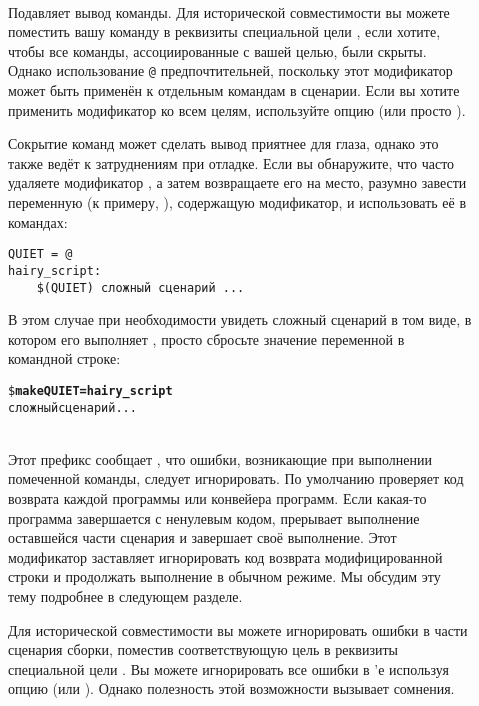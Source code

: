 \begin{description}
\item[] \hfill \\
Подавляет вывод команды. Для исторической совместимости вы можете
поместить вашу команду в реквизиты специальной цели ,
если хотите, чтобы все команды, ассоциированные с вашей целью, были
скрыты. Однако использование \texttt{@} предпочтительней, поскольку
этот модификатор может быть применён к отдельным командам в сценарии.
Если вы хотите применить модификатор ко всем целям, используйте
опцию  (или просто ).

Сокрытие команд может сделать вывод \GNUmake{} приятнее для глаза,
однако это также ведёт к затруднениям при отладке. Если вы обнаружите,
что часто удаляете модификатор , а затем возвращаете его на
место, разумно завести переменную (к примеру, ),
содержащую модификатор, и использовать её в командах:

{\footnotesize
\begin{verbatim}
QUIET = @
hairy_script:
    $(QUIET) сложный сценарий ...
\end{verbatim}
}

В этом случае при необходимости увидеть сложный сценарий в том виде, в
котором его выполняет \GNUmake{}, просто сбросьте значение переменной
 в командной строке:

{\footnotesize
\begin{alltt}
\${} \textbf{make QUIET= hairy\_script}
сложный сценарий ...
\end{alltt}
}

\item[\command{-}] \hfill \\
Этот префикс сообщает \GNUmake{}, что ошибки, возникающие при
выполнении помеченной команды, следует игнорировать. По умолчанию
\GNUmake{} проверяет код возврата каждой программы или конвейера
программ. Если какая-то программа завершается с ненулевым кодом,
\GNUmake{} прерывает выполнение оставшейся части сценария и завершает
своё выполнение. Этот модификатор заставляет \GNUmake{} игнорировать
код возврата модифицированной строки и продолжать выполнение в обычном
режиме. Мы обсудим эту тему подробнее в следующем разделе.

Для исторической совместимости вы можете игнорировать ошибки в части
сценария сборки, поместив соответствующую цель в реквизиты специальной
цели . Вы можете игнорировать все ошибки в
\Makefile{}'е используя опцию 
(или ).  Однако полезность этой возможности вызывает
сомнения.


\end{description}

